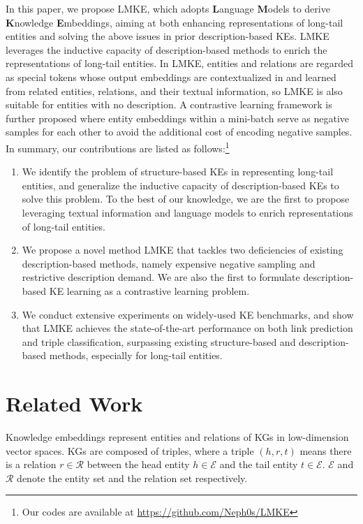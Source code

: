 \documentclass{article}
\begin{document}
In this paper, we propose LMKE, which adopts \textbf{L}anguage \textbf{M}odels to derive  \textbf{K}nowledge \textbf{E}mbeddings,
aiming at both enhancing representations of long-tail entities and solving the above issues in prior description-based KEs.
LMKE leverages the inductive capacity of description-based methods to enrich the representations of long-tail entities.
In LMKE, entities and relations are regarded as special tokens  
whose output embeddings are contextualized in and learned from related entities, relations, and their textual information, 
so LMKE is also suitable for entities with no description.
A contrastive learning framework is further proposed 
where entity embeddings within a mini-batch serve as negative samples for each other 
to avoid the additional cost of encoding negative samples.   
In summary, our contributions are listed as follows:\footnote{Our codes are available at \url{https://github.com/Neph0s/LMKE}}
\begin{enumerate}
\item We identify the problem of structure-based KEs in representing long-tail entities, and generalize the inductive capacity of description-based KEs to solve this problem. 
    To the best of our knowledge, we are the first to propose leveraging textual information and language models to enrich representations of long-tail entities.
\item We propose a novel method LMKE that tackles two deficiencies of existing description-based methods, namely expensive negative sampling and restrictive description demand. 
    We are also the first to formulate description-based KE learning as a contrastive learning problem.
\item We conduct extensive experiments on widely-used \quad KE benchmarks, and show that LMKE achieves the state-of-the-art  performance on both link prediction and triple classification, surpassing existing structure-based and description-based methods, especially for long-tail entities. 
\end{enumerate}







\section{Related Work}
Knowledge embeddings represent entities and relations of KGs in low-dimension vector spaces.
KGs are composed of triples, where a triple $(h, r, t)$ means there is a relation $r\in\mathcal{R}$ between the head entity $h\in\mathcal{E}$ and the tail entity $t\in\mathcal{E}$. $\mathcal{E}$ and $\mathcal{R}$ denote the entity set and the relation set respectively. 
\end{document}
